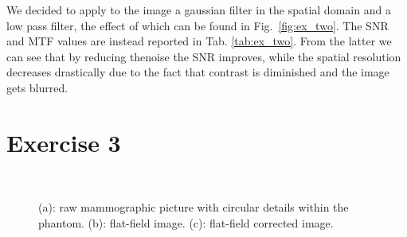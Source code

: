 \documentclass[a4paper]{article}
\begin{document}
We decided to apply to the image a gaussian filter in the spatial domain and a low pass filter, the effect of which can be found in Fig.~\ref{fig:ex_two}. The SNR and MTF values are instead reported in Tab. \ref{tab:ex_two}. From the latter we can see that by reducing thenoise the SNR improves, while the spatial resolution decreases drastically due to the fact that contrast is diminished and the image gets blurred.



\section*{Exercise 3}

\begin{figure}[H]
	\centering
  \quad
  \\
  \caption{(a): raw mammographic picture with circular details within the phantom. (b): flat-field image. (c): flat-field corrected image.}
  \label{fig:ex_three}
\end{figure}
\end{document}
